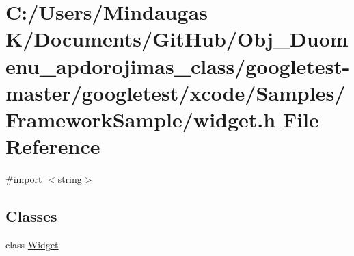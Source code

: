 \hypertarget{googletest-master_2googletest_2xcode_2_samples_2_framework_sample_2widget_8h}{}\section{C\+:/\+Users/\+Mindaugas K/\+Documents/\+Git\+Hub/\+Obj\+\_\+\+Duomenu\+\_\+apdorojimas\+\_\+class/googletest-\/master/googletest/xcode/\+Samples/\+Framework\+Sample/widget.h File Reference}
\label{googletest-master_2googletest_2xcode_2_samples_2_framework_sample_2widget_8h}
{\ttfamily \#import $<$string$>$}\newline
\subsection*{Classes}
\begin{DoxyCompactItemize}
\item 
class \mbox{\hyperlink{class_widget}{Widget}}
\end{DoxyCompactItemize}
